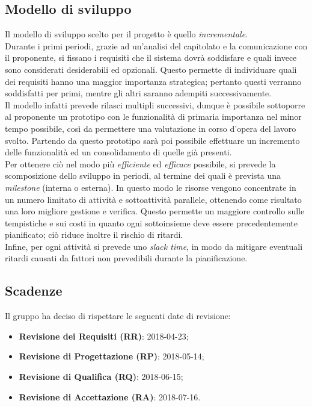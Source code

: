 \subsection{Modello di sviluppo}
Il modello di sviluppo scelto per il progetto è quello \emph{incrementale}.\\
Durante i primi periodi, grazie ad un'analisi del capitolato e la comunicazione con il proponente, si fissano i requisiti che il sistema dovrà soddisfare e quali invece sono considerati desiderabili ed opzionali. Questo permette di individuare quali dei requisiti hanno una maggior importanza strategica; pertanto questi verranno soddisfatti per primi, mentre gli altri saranno adempiti successivamente.\\
Il modello infatti prevede rilasci multipli successivi, dunque è possibile sottoporre al proponente un prototipo con le funzionalità di primaria importanza nel minor tempo possibile, così da permettere una valutazione in corso d’opera del lavoro svolto. Partendo da questo prototipo sarà poi possibile effettuare un incremento delle funzionalità ed un consolidamento di quelle già presenti.\\
Per ottenere ciò nel modo più \emph{efficiente} ed \emph{efficace} possibile, si prevede la scomposizione dello sviluppo in periodi, al termine dei quali è prevista una \emph{milestone} (interna o esterna). In questo modo le risorse vengono concentrate in un numero limitato di attività e sottoattività parallele, ottenendo come risultato una loro migliore gestione e verifica.
Questo permette un maggiore controllo sulle tempistiche e sui costi in quanto ogni sottoinsieme deve essere precedentemente pianificato; ciò riduce inoltre il rischio di ritardi.\\
Infine, per ogni attività si prevede uno \emph{slack time}, in modo da mitigare eventuali ritardi causati da fattori non prevedibili durante la pianificazione.

\subsection{Scadenze}\label{Scadenze}
Il gruppo \Gruppo{} ha deciso di rispettare le seguenti date di revisione:
\begin{itemize}
	\item \textbf{Revisione dei Requisiti (RR)}: 2018-04-23;
	\item \textbf{Revisione di Progettazione (RP)}: 2018-05-14;
	\item \textbf{Revisione di Qualifica (RQ)}: 2018-06-15;
	\item \textbf{Revisione di Accettazione (RA)}: 2018-07-16.
\end{itemize}
